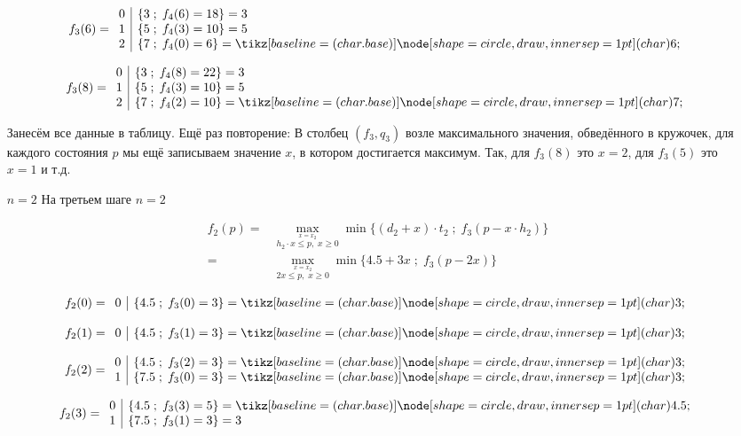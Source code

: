 \begin{enumerate}
	\[
		f_3(6) = \begin{array}{c|l}
			0 & \{3 \; ; \; f_4(6) = 18\} = 3 \\
			1 & \{5 \; ; \; f_4(3) = 10\} = 5 \\
			2 & \{7 \; ; \; f_4(0) = 6\} = \circled{6}
		\end{array}
	\]
	
	\[
		f_3(8) = \begin{array}{c|l}
			0 & \{3 \; ; \; f_4(8) = 22\} = 3 \\
			1 & \{5 \; ; \; f_4(3) = 10\} = 5 \\
			2 & \{7 \; ; \; f_4(2) = 10\} = \circled{7}
		\end{array}
	\]
	
	Занесём все данные в таблицу. Ещё раз повторение: В столбец $(f_3, q_3)$ возле максимального значения, обведённого в кружочек, для каждого состояния $p$ мы ещё записываем значение $x$, в котором достигается максимум. Так, для $f_3(8)$ это $x = 2$, для $f_3(5)$ это $x = 1$ и т.д.

	\item[$\boxed{n = 2}$] На третьем шаге $n = 2$
	
	\begin{align*}
		f_2(p) =& \max_{\stackrel{x = x_2}{h_2 \cdot x \le p, \; x \ge 0}} \min\Big\{(d_2 + x) \cdot t_2 \; ; \; f_{3}(p - x \cdot h_2)\Big\} \\
		=& \max_{\stackrel{x = x_2}{2x \le p, \; x \ge 0}} \min\Big\{4.5 + 3x \; ; \; f_{3}(p - 2x)\Big\}
	\end{align*}
	
	\[
		f_2(0) = \begin{array}{c|l}
			0 & \{4.5 \; ; \; f_3(0) = 3\} = \circled{3}
		\end{array}
	\]
	
	\[
		f_2(1) = \begin{array}{c|l}
			0 & \{4.5 \; ; \; f_3(1) = 3\} = \circled{3}
		\end{array}
	\]
	
	\[
		f_2(2) = \begin{array}{c|l}
			0 & \{4.5 \; ; \; f_3(2) = 3\} = \circled{3} \\
			1 & \{7.5 \; ; \; f_3(0) = 3\} = \circled{3}
		\end{array}
	\]
	
	\[
		f_2(3) = \begin{array}{c|l}
			0 & \{4.5 \; ; \; f_3(3) = 5\} = \circled{4.5} \\
			1 & \{7.5 \; ; \; f_3(1) = 3\} = 3
		\end{array}
	\]
	

\end{enumerate}
